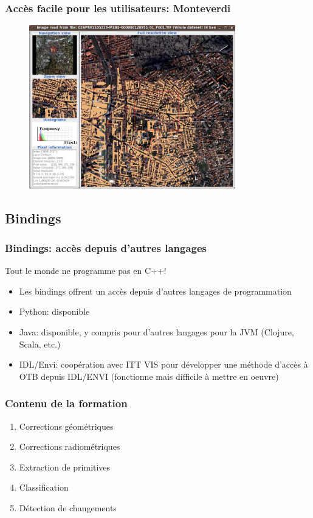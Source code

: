 \documentclass[compress,handout]{beamer}
\begin{document}
\begin{frame}
\frametitle{Accès facile pour les utilisateurs: Monteverdi}
\begin{figure}[]
  \includegraphics[width=0.8\textwidth]{monteverdi2.jpg}
\end{figure}
\end{frame}

\subsection{Bindings}
\begin{frame}
\frametitle{Bindings: accès depuis d'autres langages}
\begin{block}{Tout le monde ne programme pas en C++!}
\scriptsize
\begin{itemize}
\item Les bindings offrent un accès depuis d'autres langages de programmation
\item \alert{Python}: disponible
\item \alert{Java}: disponible, y compris pour d'autres langages pour
  la JVM (Clojure, Scala, etc.)
\item \alert{IDL/Envi}: coopération avec ITT VIS pour développer une
  méthode d'accès à OTB depuis IDL/ENVI (fonctionne mais difficile à
  mettre en oeuvre)
\end{itemize}
\end{block}
\end{frame}


\begin{frame}
  \frametitle{Contenu de la formation}
  \begin{enumerate}
  \item Corrections géométriques
  \item Corrections radiométriques
  \item Extraction de primitives
  \item Classification
  \item Détection de changements
  \end{enumerate}
\end{frame}
\end{document}
